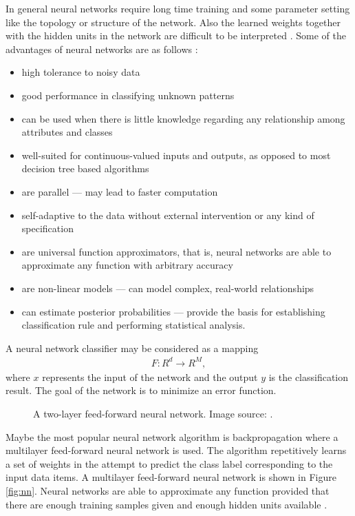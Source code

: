 In general neural networks require long time training and some parameter setting like the topology or structure of the network. Also the learned weights together with the hidden units in the network are difficult to be interpreted  \cite{Han06DataMining}. Some of the advantages of neural networks are as follows \cite{Zhang00Neural,Miyake91Aneural}:
\begin{itemize}
\item high tolerance to noisy data 
\item good performance in classifying unknown patterns
\item can be used when there is little knowledge regarding any relationship among attributes and classes
\item well-suited for continuous-valued inputs and outputs, as opposed to most decision tree based algorithms
\item are parallel --- may lead to faster computation
\item self-adaptive to the data without external intervention or any kind of specification
\item are universal function approximators, that is, neural networks are able to approximate any function with arbitrary accuracy
\item are non-linear models --- can model complex, real-world relationships
\item can estimate posterior probabilities --- provide the basis for establishing classification rule and performing statistical analysis.
\end{itemize}

A neural network classifier may be considered as a mapping 
\begin{align}
F: R^{d} \rightarrow R^{M},
\end{align}
where $x$ represents the input of the network and the output $y$ is the classification result. The goal of the network is to minimize an error function. 

\begin{figure}[h!]
\label{fig:nn}
\centerline{}
      \caption[Neural network]{A two-layer feed-forward neural network. Image source: \cite{Han06DataMining}.}
\label{fig:decisiontree}
\end{figure}

Maybe the most popular neural network algorithm is backpropagation where a multilayer feed-forward neural network is used. The algorithm repetitively learns a set of weights in the attempt to predict the class label corresponding to the input data items. A multilayer feed-forward neural network is shown in Figure \ref{fig:nn}. 
Neural networks are able to approximate any function provided that there are enough training samples given and enough hidden units available \cite{Han06DataMining}.

